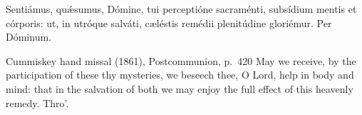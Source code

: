 Sentiámus, quǽsumus, Dómine, tui perceptióne sacraménti, subsídium mentis et
córporis: ut, in utróque salváti, cæléstis remédii plenitúdine gloriémur.
Per Dóminum.
\finishfulltextelement
\begin{fulltextenglish}{Cummiskey hand missal (1861), Postcommunion, p.~420}
May we receive, by the participation of these thy mysteries, we beseech thee,
O Lord, help in body and mind: that in the salvation of both we may enjoy the
full effect of this heavenly remedy. Thro'.
\end{fulltextenglish}
